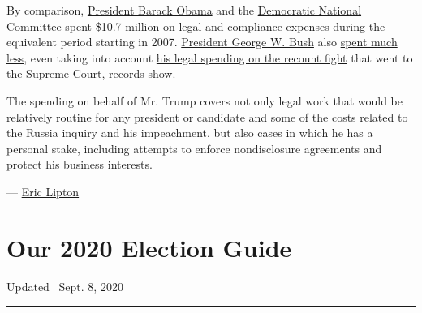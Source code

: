 By comparison,
\href{https://www.fec.gov/data/disbursements/?data_type=processed\&committee_id=C00431445\&committee_id=C00451393\&committee_id=C00494740\&min_date=01\%2F01\%2F2007\&max_date=08\%2F30\%2F2012\&disbursement_description=compliance\&disbursement_description=legal}{President
Barack Obama} and the
\href{https://www.fec.gov/data/disbursements/?data_type=processed\&committee_id=C00010603\&two_year_transaction_period=2008\&two_year_transaction_period=2010\&two_year_transaction_period=2012\&two_year_transaction_period=2014\&min_date=07\%2F01\%2F2008\&max_date=12\%2F31\%2F2012\&disbursement_description=legal+\&disbursement_description=compliance}{Democratic
National Committee} spent \$10.7 million on legal and compliance
expenses during the equivalent period starting in 2007.
\href{https://transition.fec.gov/press/summaries/2000/tables/presidential/Pres2_2000_24m.pdf}{President
George W. Bush} also
\href{https://www.fec.gov/data/disbursements/?data_type=processed\&committee_id=C00343509\&committee_id=C00386987\&committee_id=C00388579\&committee_id=C00404343\&min_date=01\%2F01\%2F2001\&max_date=12\%2F31\%2F2004\&disbursement_description=compliance\&disbursement_description=legal}{spent
much less}, even taking into account
\href{http://www.politicalmoneyline.com/noaccess.aspx}{his legal
spending on the recount fight} that went to the Supreme Court, records
show.

The spending on behalf of Mr. Trump covers not only legal work that
would be relatively routine for any president or candidate and some of
the costs related to the Russia inquiry and his impeachment, but also
cases in which he has a personal stake, including attempts to enforce
nondisclosure agreements and protect his business interests.

--- \href{https://www.nytimes3xbfgragh.onion/by/eric-lipton}{Eric
Lipton}

\hypertarget{our-2020-election-guide}{%
\section{Our 2020 Election Guide}\label{our-2020-election-guide}}

Updated ~Sept. 8, 2020

\begin{center}\rule{0.5\linewidth}{\linethickness}\end{center}


